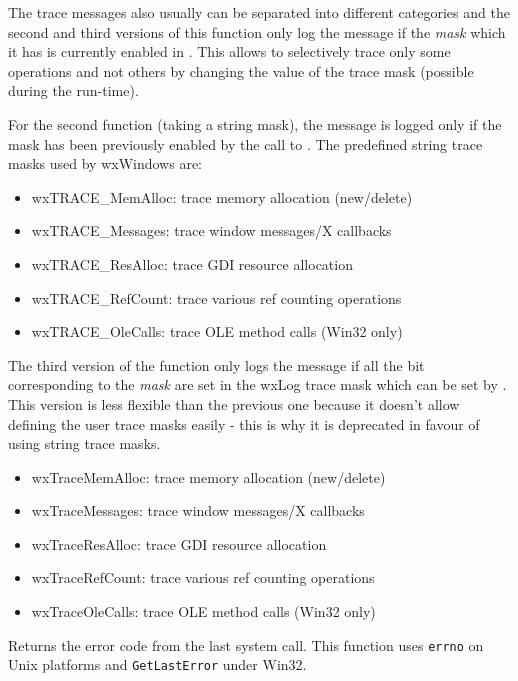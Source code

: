 The trace messages also usually can be separated into different categories and
the second and third versions of this function only log the message if the
{\it mask} which it has is currently enabled in . This
allows to selectively trace only some operations and not others by changing
the value of the trace mask (possible during the run-time).

For the second function (taking a string mask), the message is logged only if
the mask has been previously enabled by the call to
. The predefined string trace masks
used by wxWindows are:

\begin{itemize}\itemsep=0pt
\item wxTRACE\_MemAlloc: trace memory allocation (new/delete)
\item wxTRACE\_Messages: trace window messages/X callbacks
\item wxTRACE\_ResAlloc: trace GDI resource allocation
\item wxTRACE\_RefCount: trace various ref counting operations
\item wxTRACE\_OleCalls: trace OLE method calls (Win32 only)
\end{itemize}

The third version of the function only logs the message if all the bit
corresponding to the {\it mask} are set in the wxLog trace mask which can be
set by . This version is less
flexible than the previous one because it doesn't allow defining the user
trace masks easily - this is why it is deprecated in favour of using string
trace masks.

\begin{itemize}\itemsep=0pt
\item wxTraceMemAlloc: trace memory allocation (new/delete)
\item wxTraceMessages: trace window messages/X callbacks
\item wxTraceResAlloc: trace GDI resource allocation
\item wxTraceRefCount: trace various ref counting operations
\item wxTraceOleCalls: trace OLE method calls (Win32 only)
\end{itemize}

\label{wxsyserrorcode}


Returns the error code from the last system call. This function uses
{\tt errno} on Unix platforms and {\tt GetLastError} under Win32.

